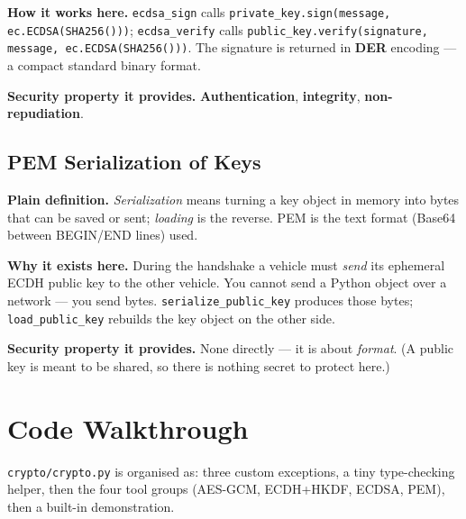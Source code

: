 \documentclass[11pt,a4paper]{report}
\begin{document}
\textbf{How it works here.} \texttt{ecdsa\_sign} calls
\texttt{private\_key.sign(message, ec.ECDSA(SHA256()))}; \texttt{ecdsa\_verify}
calls \texttt{public\_key.verify(signature, message, ec.ECDSA(SHA256()))}. The
signature is returned in \textbf{DER} encoding --- a compact standard binary
format.

\textbf{Security property it provides.} \textbf{Authentication},
\textbf{integrity}, \textbf{non-repudiation}.

\subsection{PEM Serialization of Keys}
\textbf{Plain definition.} \emph{Serialization} means turning a key object in
memory into bytes that can be saved or sent; \emph{loading} is the reverse. PEM
is the text format (Base64 between BEGIN/END lines) used.

\textbf{Why it exists here.} During the handshake a vehicle must \emph{send} its
ephemeral ECDH public key to the other vehicle. You cannot send a Python object
over a network --- you send bytes. \texttt{serialize\_public\_key} produces those
bytes; \texttt{load\_public\_key} rebuilds the key object on the other side.

\textbf{Security property it provides.} None directly --- it is about
\emph{format}. (A public key is meant to be shared, so there is nothing secret to
protect here.)

\section{Code Walkthrough}

\texttt{crypto/crypto.py} is organised as: three custom exceptions, a tiny
type-checking helper, then the four tool groups (AES-GCM, ECDH+HKDF, ECDSA, PEM),
then a built-in demonstration.
\end{document}
